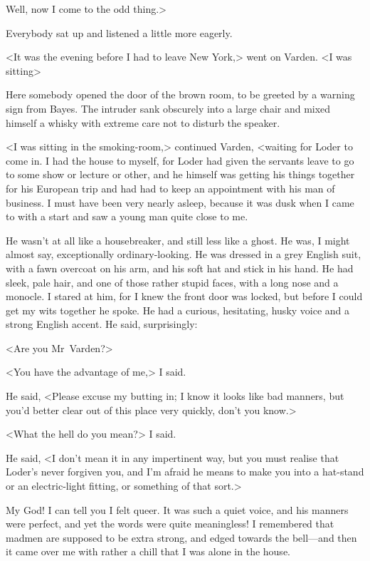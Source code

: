 Well, now I come to the odd thing.>

Everybody sat up and listened a little more eagerly.

<It was the evening before I had to leave New York,> went on Varden. <I was sitting\longdash>

Here somebody opened the door of the brown room, to be greeted by a warning sign from Bayes. The intruder sank obscurely into a large chair and mixed himself a whisky with extreme care not to disturb the speaker.

<I was sitting in the smoking-room,> continued Varden, <waiting for Loder to come in. I had the house to myself, for Loder had given the servants leave to go to some show or lecture or other, and he himself was getting his things together for his European trip and had had to keep an appointment with his man of business. I must have been very nearly asleep, because it was dusk when I came to with a start and saw a young man quite close to me.

He wasn't at all like a housebreaker, and still less like a ghost. He was, I might almost say, exceptionally ordinary-looking. He was dressed in a grey English suit, with a fawn overcoat on his arm, and his soft hat and stick in his hand. He had sleek, pale hair, and one of those rather stupid faces, with a long nose and a monocle. I stared at him, for I knew the front door was locked, but before I could get my wits together he spoke. He had a curious, hesitating, husky voice and a strong English accent. He said, surprisingly:

<Are you Mr~Varden?>

<You have the advantage of me,> I said.

He said, <Please excuse my butting in; I know it looks like bad manners, but you'd better clear out of this place very quickly, don't you know.>

<What the hell do you mean?> I said.

He said, <I don't mean it in any impertinent way, but you must realise that Loder's never forgiven you, and I'm afraid he means to make you into a hat-stand or an electric-light fitting, or something of that sort.>

My God! I can tell you I felt queer. It was such a quiet voice, and his manners were perfect, and yet the words were quite meaningless! I remembered that madmen are supposed to be extra strong, and edged towards the bell—and then it came over me with rather a chill that I was alone in the house.

